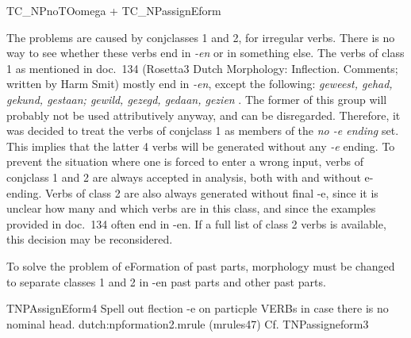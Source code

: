 \begin{mruleclass}{TC\_NPnoTOomega + TC\_NPassignEform}
\begin{members}
\begin{member}
\begin{enumerate}
The problems are caused by conjclasses 1 and 2, for irregular verbs. There is 
no way to see whether these verbs end in {\em -en\/} or in something else. The
verbs of class 1 as mentioned in doc.\ 134 (Rosetta3 Dutch Morphology: 
Inflection. Comments; written by Harm Smit) mostly end in {\em -en\/}, except the 
following: {\em geweest, gehad, gekund, gestaan; gewild, gezegd, gedaan, gezien
\/}. The former of this group will probably not be used attributively anyway, 
and can be disregarded. Therefore, it was decided to treat the verbs of 
conjclass 1 as members of the {\em no -e ending\/} set. This implies that the 
latter 4 verbs will be generated without any {\em -e\/} ending. To prevent the 
situation where one is forced to enter a wrong input, 
verbs of conjclass 1 and 2 are always accepted in analysis, both with 
and without e-ending.
Verbs of class 2 are also always generated without final -e, since it is 
unclear how many and which verbs are in this class, and since the examples 
provided in doc.\ 134 often end in -en. If a full list of class 2 verbs is 
available, this decision may be reconsidered.

To solve the problem of eFormation of past parts, morphology must be changed to 
separate classes 1 and 2 in -en past parts and other past parts.
\end{enumerate}

\end{member}
\begin{member}
 TNPAssignEform4
 Spell out flection -e on particple VERBs 
in case there is no nominal 
head.
\file dutch:npformation2.mrule (mrules47)
\semantics \nosemantics
{}
\remarks 
Cf. TNPassigneform3

\end{member}
\end{members}
\end{mruleclass}


